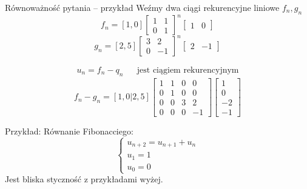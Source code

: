 \documentclass[handout]{beamer}
\theoremstyle{definition}
\begin{document}
\begin{frame}{Równoważność pytania -- przykład}
Weźmy dwa ciągi rekurencyjne liniowe $f_n, g_n$
    \begin{equation*}
        f_{n} = [1,0] \begin{bmatrix}
            1 & 1 \\
            0 & 1 
        \end{bmatrix}^{n}
        \begin{bmatrix}
            1 & 0
        \end{bmatrix}
    \end{equation*}
    \begin{equation*}
         g_{n} = [2,5] \begin{bmatrix}
            3 & 2 \\
            0 & -1 
        \end{bmatrix}^{n}
        \begin{bmatrix}
            2 & -1
        \end{bmatrix}
    \end{equation*}
    
    \begin{align*}
        u_n = f_n - q_n && \text{jest ciągiem rekurencyjnym} 
    \end{align*}
    $$
        f_n - g_n = [1,0|2,5] 
        \left[
        \begin{array}{cc|cc}
        1 & 1 & 0 & 0 \\
        0 & 1 & 0 & 0 \\
        \hline
        0 & 0 & 3 & 2 \\
        0 & 0 & 0 & -1
        \end{array}
        \right]
        \begin{bmatrix}
            1  \\
            0  \\
            \hline
            -2 \\
            -1 
        \end{bmatrix}
    $$
    
\end{frame}

\begin{frame}
    Przykład:
    Równanie Fibonacciego:
   \begin{equation*}
        \begin{cases}
        u_{n+2} = u_{n+1} + u_n \\
        u_{1} = 1 \\
        u_{0} = 0
        \end{cases}
    \end{equation*}
    Jest bliska styczność z przykładami wyżej. 

\end{frame}
\end{document}
